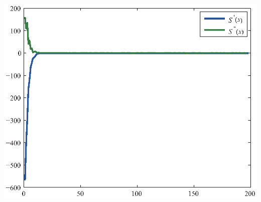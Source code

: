 \documentclass{jssc}
\begin{document}
\begin{center}
  \centerline
  {\includegraphics[scale=0.5]{1.eps}}
\end{center}
\end{document}
